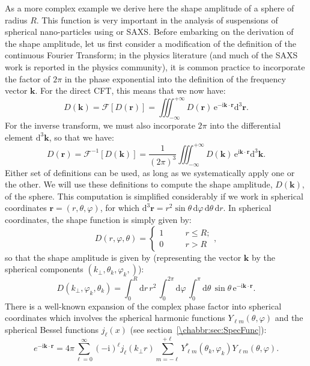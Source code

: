 As a more complex example we derive here the shape amplitude of a sphere of radius $R$.  This function is very important in the analysis of suspensions of spherical nano-particles using  or SAXS.  Before embarking on the derivation of the shape amplitude, let us first consider a modification of the definition of the continuous Fourier Transform; in the physics literature (and much of the SAXS work is reported in the physics community), it is common practice to incorporate the factor of $2\pi$ in the phase exponential into the definition of the frequency vector $\mathbf{k}$.  For the direct CFT, this means that we now have:
\[
D(\mathbf{k})=\mathcal{F}[D(\mathbf{r})] = \iiint_{-\infty}^{+\infty}\!\!\!\! D(\mathbf{r})\, \mathrm{e}^{-\mathrm{i}\mathbf{k}\cdot\mathbf{r}}\mathrm{d}^3\mathbf{r}.
\]
For the inverse transform, we must also incorporate $2\pi$ into the differential element $\mathrm{d}^3\mathbf{k}$, so that we have:
\[
D(\mathbf{r})=\mathcal{F}^{-1}[D(\mathbf{k})] = \frac{1}{(2\pi)^3}\iiint_{-\infty}^{+\infty}\!\!\!\! D(\mathbf{k})\, \mathrm{e}^{\mathrm{i}\mathbf{k}\cdot\mathbf{r}}\mathrm{d}^3\mathbf{k}.
\]
Either set of definitions can be used, as long as we systematically apply one or the other.  We will use these definitions to compute the shape amplitude, $D(\mathbf{k})$, of the sphere. This computation is simplified considerably if we work in spherical coordinates $\mathbf{r}=(r, \theta, \varphi)$, for which $\mathrm{d}^3\mathbf{r}=r^2\sin\theta\,\mathrm{d}\varphi\,\mathrm{d}\theta\,\mathrm{d}r$.  In spherical coordinates, the shape function is simply given by:
\[
	D(r,\varphi,\theta) = \left\{\begin{array}{lcl}1&\quad& r\le R;\\
	0& & r>R\end{array}\right.,
\]
so that the shape amplitude is given by (representing the vector $\mathbf{k}$ by the spherical components $(k_{\perp},\theta_k,\varphi_k,)$):
\[
	D(k_{\perp},\varphi_k,\theta_k) = \int_{0}^R\mathrm{d}r\,r^2\,\int_{0}^{2\pi}\mathrm{d}\varphi\,\int_{0}^{\pi}\mathrm{d}\theta\, \sin\theta\,  \mathrm{e}^{-\mathrm{i}\mathbf{k}\cdot\mathbf{r}}.
\]
There is a well-known expansion of the complex phase factor into spherical coordinates which involves the spherical harmonic functions $Y_{\ell m}(\theta,\varphi)$ and the spherical Bessel functions $j_\ell(x)$ (see section~\ref{\chabbr:sec:SpecFunc}):
\[
	e^{-\mathrm{i}\mathbf{k}\cdot\mathbf{r}} = 4\pi\sum_{\ell=0}^{\infty}(\mathrm{-i})^{\ell} j_{\ell}(k_{\perp}r)\sum_{m=-\ell}^{+\ell} Y^{\ast}_{\ell m}(\theta_k,\varphi_k)Y_{\ell m}(\theta,\varphi).
\]
